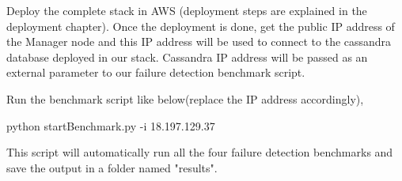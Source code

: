 Deploy the complete stack in AWS (deployment steps are explained in the deployment chapter). Once the deployment is done, get the public IP address of the Manager node and this IP address will be used to connect to the cassandra database deployed in our stack. Cassandra IP address will be passed as an external parameter to our failure detection benchmark script.

Run the benchmark script like below(replace the IP address accordingly),

\begin{center}
    python startBenchmark.py -i 18.197.129.37
\end{center}

This script will automatically run all the four failure detection benchmarks and save the output in a folder named "results".